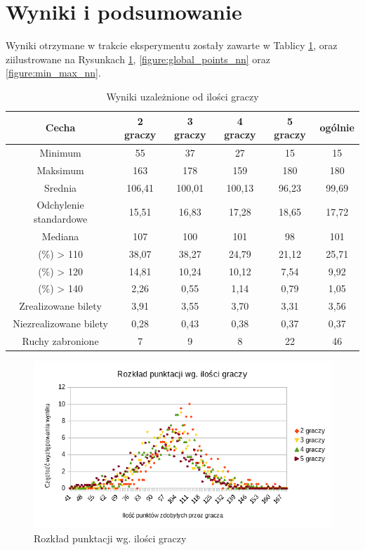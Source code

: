 \documentclass[12pt, oneside]{report}
\begin{document}
\section{Wyniki i podsumowanie} 
Wyniki otrzymane w trakcie eksperymentu zostały zawarte w Tablicy \ref{table:nn_sizeresult}, oraz ziilustrowane na Rysunkach \ref{figure:player_points_nn}, \ref{figure:global_points_nn} oraz \ref{figure:min_max_nn}.

\begin{table}[h]
	\begin{center}
		\begin{tabular}{| c | c | c | c | c | c |} \hline
			Cecha & 2 graczy & 3 graczy & 4 graczy & 5 graczy & ogólnie \\ \hline
			Minimum & 55 & 37 & 27 & 15 & 15 \\ \hline
			Maksimum & 163 & 178 & 159 & 180 & 180 \\ \hline
			Srednia & 106,41 & 100,01 & 100,13 & 96,23 & 99,69 \\ \hline
			Odchylenie standardowe &
			15,51 & 16,83 & 17,28 & 18,65 & 17,72 \\ \hline 
			Mediana & 107 & 100 & 101 & 98 & 101 \\ \hline
			(\%) > 110 & 38,07 & 38,27 & 24,79 & 21,12 & 25,71 \\ \hline
			(\%) > 120 & 14,81 & 10,24 & 10,12 & 7,54 & 9,92 \\ \hline
			(\%) > 140 & 2,26 & 0,55 & 1,14 & 0,79 & 1,05 \\ \hline
			Zrealizowane bilety & 3,91 & 3,55 & 3,70 & 3,31 & 3,56 \\ \hline
			Niezrealizowane bilety & 0,28 & 0,43 & 0,38 & 0,37 & 0,37 \\ \hline
			Ruchy zabronione & 7&9&8&22&46 \\ \hline
		\end{tabular}
		\caption{Wyniki uzależnione od ilości graczy}
		\label{table:nn_sizeresult}
	\end{center}
\end{table}

\begin{figure}[h]
	\includegraphics[width=\linewidth]{NNWykrespunktow.png}
	\caption{Rozkład punktacji wg. ilości graczy}
	\label{figure:player_points_nn}
\end{figure}
\end{document}
